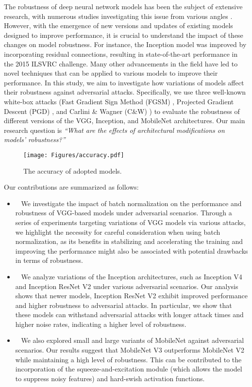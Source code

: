 The robustness of deep neural network models has been the subject of extensive research, with numerous studies investigating this issue from various angles \cite{juraev2022depth}. However, with the emergence of new versions and updates of existing models designed to improve performance, it is crucial to understand the impact of these changes on model robustness. For instance, the Inception model was improved by incorporating residual connections, resulting in state-of-the-art performance in the 2015 ILSVRC challenge. 
Many other advancements in the field have led to novel techniques that can be applied to various models to improve their performance.
In this study, we aim to investigate how variations of models affect their robustness against adversarial attacks. Specifically, we use three well-known white-box attacks (Fast Gradient Sign Method (FGSM) \cite{goodfellow2015explaining}, Projected Gradient Descent (PGD) \cite{kurakin2017adversarial}, and  Carlini \& Wagner (C\&W) \cite{carlini2017towards}) to evaluate the robustness of different versions of the VGG, Inception, and MobileNet architectures. Our main research question is \textit{``What are the effects of architectural modifications on models' robustness?''}     

\begin{figure*}[h]
    \centering
    \texttt{[image: Figures/accuracy.pdf]}
    \caption{The accuracy of adopted models.}
    \label{fig:accuracy} 
\end{figure*}

 Our contributions are summarized as follows:
\begin{itemize}[label={}, leftmargin=2ex] 
    \item {}~ We investigate the impact of batch normalization on the performance and robustness of VGG-based models under adversarial scenarios. Through a series of experiments targeting variations of VGG models via various attacks, we highlight the necessity for careful consideration when using batch normalization, as its benefits in stabilizing and accelerating the training and improving the performance might also be associated with potential drawbacks in terms of robustness.
    \item {}~ We analyze variations of the Inception architectures, such as Inception V4 and Inception ResNet V2 under various adversarial scenarios. Our analysis shows that newer models, \eg Inception ResNet V2 exhibit improved performance and higher robustness to adversarial attacks.
    In particular, we show that these models can withstand adversarial attacks with longer attack times and higher noise rates, indicating a higher level of robustness. 
    \item {}~ We also explored small and large variants of MobileNet against adversarial scenarios. Our results suggest that MobileNet V3 outperforms MobileNet V2 while maintaining a high level of robustness. This can be contributed to the incorporation of the squeeze-and-excitation module (which allows the model to suppress noisy features) and hard-swish activation functions.
\end{itemize} 




